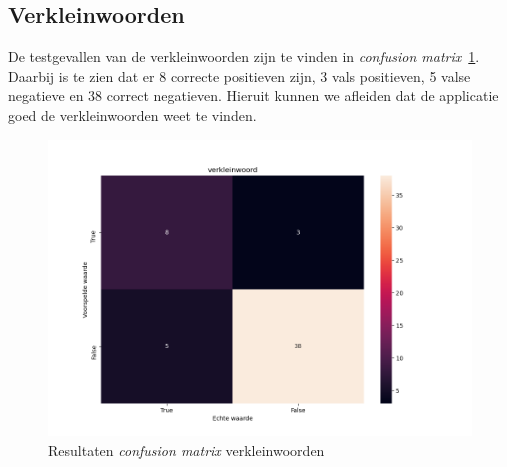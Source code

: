 \subsection{Verkleinwoorden}
De testgevallen van de verkleinwoorden zijn te vinden in \textit{confusion matrix}~\ref{fig:cfm_verkleinwoord}. Daarbij is te zien dat er 8 correcte positieven zijn, 3 vals positieven, 5 valse negatieve en 38 correct negatieven.
Hieruit kunnen we afleiden dat de applicatie goed de verkleinwoorden weet te vinden.
\begin{figure}
	\centering
	\includegraphics[width=1\textwidth]{./img/cfm_verkleinwoord}
	\caption{\label{fig:cfm_verkleinwoord} Resultaten \textit{confusion matrix} verkleinwoorden}
\end{figure}


